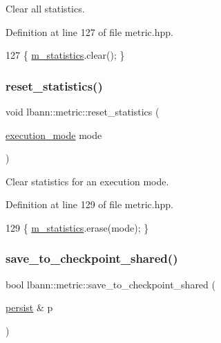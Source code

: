 Clear all statistics. 

Definition at line 127 of file metric.\+hpp.


\begin{DoxyCode}
127 \{ \hyperlink{classlbann_1_1metric_a9949d8aceedbc113aa2c356046ed73fc}{m\_statistics}.clear(); \}
\end{DoxyCode}
\mbox{\label{classlbann_1_1metric_a27a3d8c073b85297b902ba35137926b4}} 
\subsubsection{\texorpdfstring{reset\+\_\+statistics()}{reset\_statistics()}\hspace{0.1cm}{\footnotesize\ttfamily [2/2]}}
{\footnotesize\ttfamily void lbann\+::metric\+::reset\+\_\+statistics (\begin{DoxyParamCaption}\item[{\hyperlink{base_8hpp_a2781a159088df64ed7d47cc91c4dc0a8}{execution\+\_\+mode}}]{mode }\end{DoxyParamCaption})\hspace{0.3cm}{\ttfamily [inline]}}

Clear statistics for an execution mode. 

Definition at line 129 of file metric.\+hpp.


\begin{DoxyCode}
129 \{ \hyperlink{classlbann_1_1metric_a9949d8aceedbc113aa2c356046ed73fc}{m\_statistics}.erase(mode); \}
\end{DoxyCode}
\mbox{\label{classlbann_1_1metric_a9728b02a240dfd9faa61b7dfeb3feede}} 
\subsubsection{\texorpdfstring{save\+\_\+to\+\_\+checkpoint\+\_\+shared()}{save\_to\_checkpoint\_shared()}}
{\footnotesize\ttfamily bool lbann\+::metric\+::save\+\_\+to\+\_\+checkpoint\+\_\+shared (\begin{DoxyParamCaption}\item[{\hyperlink{classlbann_1_1persist}{persist} \&}]{p }\end{DoxyParamCaption})\hspace{0.3cm}{\ttfamily [virtual]}}

